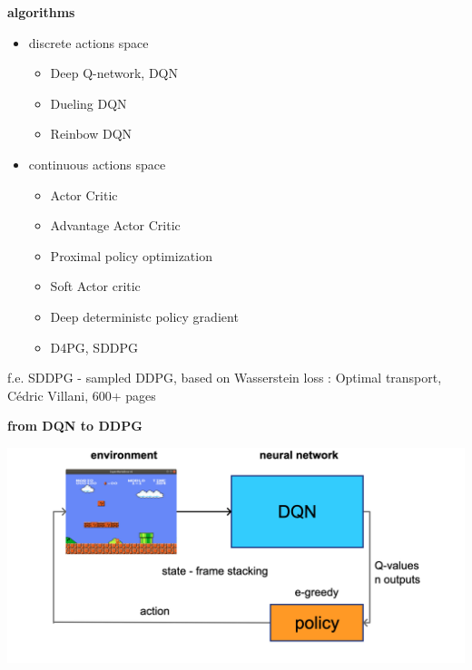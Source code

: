\documentclass[xcolor=dvipsnames]{beamer}
\begin{document}
\begin{frame}{\bf algorithms}
   \begin{itemize}
    \item discrete actions space

        \begin{itemize}
          \item Deep Q-network, DQN
          \item Dueling DQN
          \item Reinbow DQN
        \end{itemize}

    \item continuous actions space
    
        \begin{itemize}
          \item Actor Critic
          \item Advantage Actor Critic
          \item Proximal policy optimization
          \item Soft Actor critic
          \item Deep deterministc policy gradient
          \item D4PG, SDDPG
        \end{itemize}
    
  \end{itemize}

  f.e. SDDPG - sampled DDPG, based on Wasserstein loss : Optimal transport, Cédric Villani, 600+ pages

\end{frame}


\begin{frame}{\bf from DQN to DDPG}

  {\centering \includegraphics[scale=0.2]{../diagrams/dqn.png}}
\end{frame}
\end{document}
